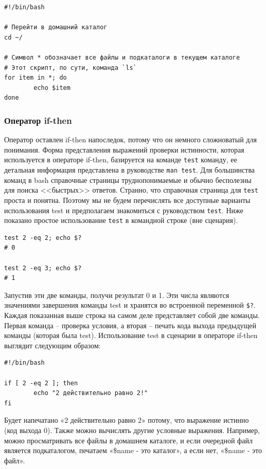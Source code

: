 \documentclass[12pt]{article}
\begin{document}
\begin{verbatim}
#!/bin/bash

# Перейти в домашний каталог
cd ~/

# Символ * обозначает все файлы и подкаталоги в текущем каталоге
# Этот скрипт, по сути, команда `ls`
for item in *; do
        echo $item
done
\end{verbatim}

\hypertarget{if-then-statements}{%
\subsubsection{\texorpdfstring{\protect\hyperlink{if-then-statements}{}Оператор
if-then}{Оператор if-then}}\label{if-then-statements}}

Оператор оставлен if-then напоследок, потому что он немного сложноватый
для понимания. Форма представления выражений проверки истинности, которая
используется в операторе if-then, базируется на команде \texttt{test}
команду, ее детальная информация представлена в руководстве
\texttt{man\ test}. Для большинства команд в bash справочные страницы
труднопонимаемые и обычно бесполезны для поиска <<быстрых>> ответов.
Странно, что справочная страница для \texttt{test} проста и понятна.
Поэтому мы не будем перечислять все доступные варианты использования
test и предполагаем знакомиться с руководством \texttt{test}. Ниже
показано простое использование \texttt{test} в командной строке (вне
сценария).

\begin{verbatim}
test 2 -eq 2; echo $?
# 0

test 2 -eq 3; echo $?
# 1
\end{verbatim}

Запустив эти две команды, получи результат 0 и 1. Эти числа являются
значениями завершения команды test и хранятся во встроенной переменной
\texttt{\$?}. Каждая показанная выше строка на самом деле представляет
собой две команды. Первая команда -- проверка условия, а вторая -- печать
кода выхода предыдущей команды (которая была test). Использование test в
сценарии в операторе if-then выглядит следующим образом:

\begin{verbatim}
#!/bin/bash

if [ 2 -eq 2 ]; then
        echo "2 действительно равно 2!"
fi
\end{verbatim}

Будет напечатано «2 действительно равно 2» потому, что выражение истинно
(код выхода 0). Также можно вычислять другие условные выражения.
Например, можно просматривать все файлы в домашнем каталоге, и если
очередной файл является подкаталогом, печатаем «\$name - это каталог», а
если нет, «\$name - это файл».
\end{document}
